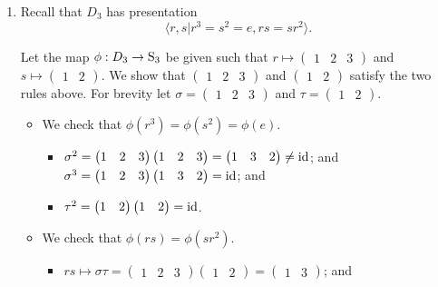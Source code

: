 \begin{enumerate}
    \item Recall that $D_3$ has presentation
    \[
        \langle r, s \vert r^3 = s^2 = e, rs = sr^2 \rangle.
    \]

    Let the map $\phi: D_3 \to \mathrm{S}_{3}$ be given such that $r \mapsto \begin{pmatrix}1 & 2 & 3\end{pmatrix}$ and $s \mapsto \begin{pmatrix}1 & 2\end{pmatrix}$. We show that $\begin{pmatrix}1 & 2 & 3\end{pmatrix}$ and $\begin{pmatrix}1 & 2\end{pmatrix}$ satisfy the two rules above. For brevity let $\sigma = \begin{pmatrix}1 & 2 & 3\end{pmatrix}$ and $\tau = \begin{pmatrix}1 & 2\end{pmatrix}$.
    \begin{itemize}
        \item We check that $\phi(r^3) = \phi(s^2) = \phi(e)$.
        \begin{itemize}
            \item $\sigma^2 = \begin{pmatrix}1 & 2 & 3\end{pmatrix}\begin{pmatrix}1 & 2 & 3\end{pmatrix} = \begin{pmatrix}1 & 3 & 2\end{pmatrix} \neq \mathrm{id}$; and $\sigma^3 = \begin{pmatrix}1 & 2 & 3\end{pmatrix}\begin{pmatrix}1 & 3 & 2\end{pmatrix} = \mathrm{id}$; and
            \item $\tau^2 = \begin{pmatrix}1 & 2\end{pmatrix}\begin{pmatrix}1 & 2\end{pmatrix} = \mathrm{id}$.
        \end{itemize}
        \item We check that $\phi(rs) = \phi(sr^2)$.
        \begin{itemize}
            \item $rs \mapsto \sigma\tau = \begin{pmatrix}1 & 2 & 3\end{pmatrix}\begin{pmatrix}1 & 2\end{pmatrix} = \begin{pmatrix}1 & 3\end{pmatrix}$; and

\end{itemize}
\end{itemize}
\end{enumerate}
